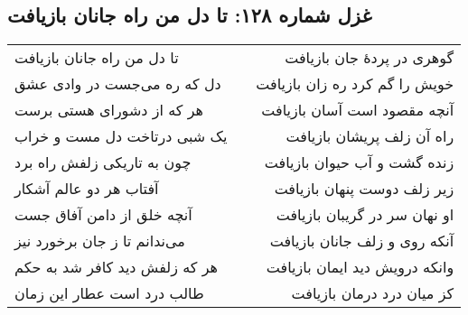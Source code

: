 \begin{center}
\section*{غزل شماره ۱۲۸: تا دل من راه جانان بازیافت}
\label{sec:128}
\begin{longtable}{l p{0.5cm} r}
تا دل من راه جانان بازیافت
&&
گوهری در پردهٔ جان بازیافت
\\
دل که ره می‌جست در وادی عشق
&&
خویش را گم کرد ره زان بازیافت
\\
هر که از دشورای هستی برست
&&
آنچه مقصود است آسان بازیافت
\\
یک شبی درتاخت دل مست و خراب
&&
راه آن زلف پریشان بازیافت
\\
چون به تاریکی زلفش راه برد
&&
زنده گشت و آب حیوان بازیافت
\\
آفتاب هر دو عالم آشکار
&&
زیر زلف دوست پنهان بازیافت
\\
آنچه خلق از دامن آفاق جست
&&
او نهان سر در گریبان بازیافت
\\
می‌ندانم تا ز جان برخورد نیز
&&
آنکه روی و زلف جانان بازیافت
\\
هر که زلفش دید کافر شد به حکم
&&
وانکه درویش دید ایمان بازیافت
\\
طالب درد است عطار این زمان
&&
کز میان درد درمان بازیافت
\\
\end{longtable}
\end{center}

